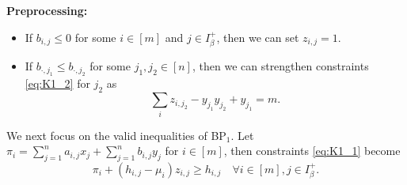 \documentclass[11pt]{article}
\begin{document}
\noindent\textbf{Preprocessing:} \begin{itemize}
	\item If $b_{i,j} \leq 0$ for some $i\in [m]$ and $j\in I_\beta^+$, then we can set $z_{i, j} = 1$. 
	\item If $b_{\cdot, j_1} \leq b_{\cdot, j_2}$ for some $j_1, j_2\in [n]$, then we can strengthen constraints \eqref{eq:K1_2} for $j_2$ as 
	\[  \sum_i z_{i,j_2} - y_{j_1}y_{j_2} + y_{j_1}  = m. \]
\end{itemize}


We next focus on the valid inequalities of BP$_1$. Let $\pi_i =  \sum_{j=1}^n a_{i,j} x_j + \sum_{j=1}^n b_{i,j} y_j$ for $i\in [m]$, then constraints \eqref{eq:K1_1} become
\[ \pi_i + (h_{i, j} - \mu_i) z_{i,j} \geq h_{i, j} \quad \forall i\in [m], j\in I_\beta^+. \]
\end{document}

